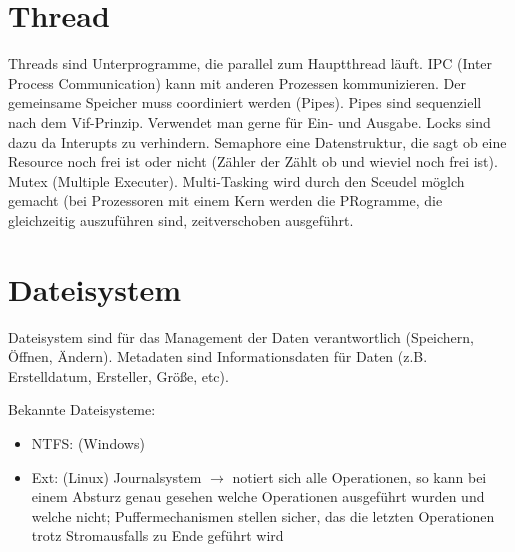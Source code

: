 \documentclass[a4paper]{report}
\begin{document}
{\chapter{Thread}

Threads sind Unterprogramme, die parallel zum Hauptthread läuft. IPC (Inter Process Communication) kann mit anderen Prozessen kommunizieren.
Der gemeinsame Speicher muss coordiniert werden (Pipes). Pipes sind sequenziell nach dem Vif-Prinzip. Verwendet man gerne für Ein- und Ausgabe. Locks sind dazu da Interupts zu verhindern. Semaphore eine Datenstruktur, die sagt ob eine Resource noch frei ist oder nicht (Zähler der Zählt ob und wieviel noch frei ist). Mutex (Multiple Executer). Multi-Tasking wird durch den Sceudel möglch gemacht (bei Prozessoren mit einem Kern werden die PRogramme, die gleichzeitig auszuführen sind, zeitverschoben ausgeführt. 

\chapter{Dateisystem}

Dateisystem sind für das Management der Daten verantwortlich (Speichern, Öffnen, Ändern). Metadaten sind Informationsdaten für Daten (z.B. Erstelldatum, Ersteller, Größe, etc).


Bekannte Dateisysteme:

\begin{itemize}
\item NTFS: (Windows)
\item Ext: (Linux) Journalsystem $\rightarrow$ notiert sich alle Operationen, so kann bei einem Absturz genau gesehen welche Operationen ausgeführt wurden und welche nicht; Puffermechanismen stellen sicher, das die letzten Operationen trotz Stromausfalls zu Ende geführt wird
\end{itemize}

}
\end{document}

